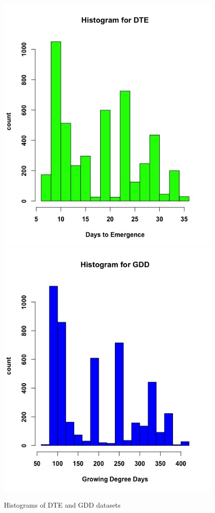 \documentclass{article}
\begin{document}
\begin{figure}[!htb]
\centering
\includegraphics[scale=.35]{hist_dte.jpeg}
\includegraphics[scale=.35]{hist_gdd.jpeg}
\caption{Histograms of DTE and GDD datasets}
\label{fig:hist}
\end{figure}
\end{document}
